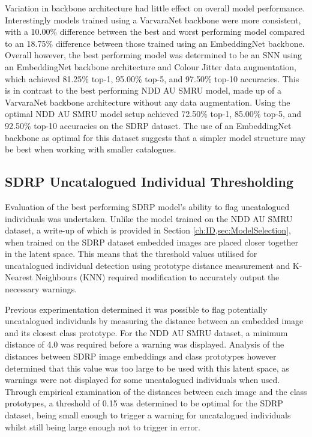 Variation in backbone architecture had little effect on overall model performance. Interestingly models trained using a VarvaraNet backbone were more consistent, with a 10.00\% difference between the best and worst performing model compared to an 18.75\% difference between those trained using an EmbeddingNet backbone. Overall however, the best performing model was determined to be an SNN using an EmbeddingNet backbone architecture and Colour Jitter data augmentation, which achieved 81.25\% top-1, 95.00\% top-5, and 97.50\% top-10 accuracies. This is in contrast to the best performing NDD AU SMRU model, made up of a VarvaraNet backbone architecture without any data augmentation. Using the optimal NDD AU SMRU model setup achieved 72.50\% top-1, 85.00\% top-5, and 92.50\% top-10 accuracies on the SDRP dataset. The use of an EmbeddingNet backbone as optimal for this dataset suggests that a simpler model structure may be best when working with smaller catalogues.

\subsection{SDRP Uncatalogued Individual Thresholding}\label{ch:SNNEvaluation,sec:SDRP,sub:uncatalogued}

Evaluation of the best performing SDRP model's ability to flag uncatalogued individuals was undertaken. Unlike the model trained on the NDD AU SMRU dataset, a write-up of which is provided in Section \ref{ch:ID,sec:ModelSelection}, when trained on the SDRP dataset embedded images are placed closer together in the latent space. This means that the threshold values utilised for uncatalogued individual detection using prototype distance measurement and K-Nearest Neighbours (KNN) required modification to accurately output the necessary warnings. 

Previous experimentation determined it was possible to flag potentially uncatalogued individuals by measuring the distance between an embedded image and its closest class prototype. For the NDD AU SMRU dataset, a minimum distance of 4.0 was required before a warning was displayed. Analysis of the distances between SDRP image embeddings and class prototypes however determined that this value was too large to be used with this latent space, as warnings were not displayed for some uncatalogued individuals when used. Through empirical examination of the distances between each image and the class prototypes, a threshold of 0.15 was determined to be optimal for the SDRP dataset, being small enough to trigger a warning for uncatalogued individuals whilst still being large enough not to trigger in error.

